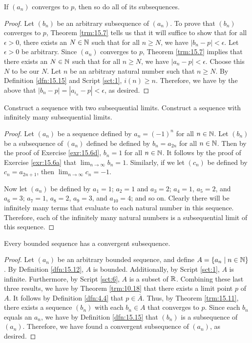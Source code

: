 \documentclass[../main.tex]{subfiles}
\begin{document}
\begin{theorem}\label{trm:15.16}
    If $(a_n)$ converges to $p$, then so do all of its subsequences.
    \begin{proof}
        Let $(b_n)$ be an arbitrary subsequence of $(a_n)$. To prove that $(b_n)$ converges to $p$, Theorem \ref{trm:15.7} tells us that it will suffice to show that for all $\epsilon>0$, there exists an $N\in\mathbb{N}$ such that for all $n\geq N$, we have $|b_n-p|<\epsilon$. Let $\epsilon>0$ be arbitrary. Since $(a_n)$ converges to $p$, Theorem \ref{trm:15.7} implies that there exists an $N\in\mathbb{N}$ such that for all $n\geq N$, we have $|a_n-p|<\epsilon$. Choose this $N$ to be our $N$. Let $n$ be an arbitrary natural number such that $n\geq N$. By Definition \ref{dfn:15.15} and Script \ref{sct:1}, $i(n)\geq n$. Therefore, we have by the above that $|b_n-p|=|a_{i_n}-p|<\epsilon$, as desired.
    \end{proof}
\end{theorem}

\begin{exercise}\label{exr:15.17}
    Construct a sequence with two subsequential limits. Construct a sequence with infinitely many subsequential limits.
    \begin{proof}
        Let $(a_n)$ be a sequence defined by $a_n=(-1)^n$ for all $n\in\mathbb{N}$. Let $(b_n)$ be a subsequence of $(a_n)$ defined be defined by $b_n=a_{2n}$ for all $n\in\mathbb{N}$. Then by the proof of Exercise \ref{exr:15.6d}, $b_n=1$ for all $n\in\mathbb{N}$. It follows by the proof of Exercise \ref{exr:15.6a} that $\lim_{n\to\infty}b_n=1$. Similarly, if we let $(c_n)$ be defined by $c_n=a_{2n+1}$, then $\lim_{n\to\infty}c_n=-1$.\par
        Now let $(a_n)$ be defined by $a_1=1$; $a_2=1$ and $a_3=2$; $a_4=1$, $a_5=2$, and $a_6=3$; $a_7=1$, $a_8=2$, $a_9=3$, and $a_{10}=4$; and so on. Clearly there will be infinitely many terms that evaluate to each natural number in this sequence. Therefore, each of the infinitely many natural numbers is a subsequential limit of this sequence.
    \end{proof}
\end{exercise}

\begin{theorem}\label{trm:15.18}
    Every bounded sequence has a convergent subsequence.
    \begin{proof}
        Let $(a_n)$ be an arbitrary bounded sequence, and define $A=\{a_n\mid n\in\mathbb{N}\}$. By Definition \ref{dfn:15.12}, $A$ is bounded. Additionally, by Script \ref{sct:1}, $A$ is infinite. Furthermore, by Script \ref{sct:6}, $A$ is a subset of $\mathbb{R}$. Combining these last three results, we have by Theorem \ref{trm:10.18} that there exists a limit point $p$ of $A$. It follows by Definition \ref{dfn:4.4} that $p\in\overline{A}$. Thus, by Theorem \ref{trm:15.11}, there exists a sequence $(b_n)$ with each $b_n\in A$ that converges to $p$. Since each $b_n$ equals an $a_n$, we have by Definition \ref{dfn:15.15} that $(b_n)$ is a subsequence of $(a_n)$. Therefore, we have found a convergent subsequence of $(a_n)$, as desired.
    \end{proof}
\end{theorem}
\end{document}
